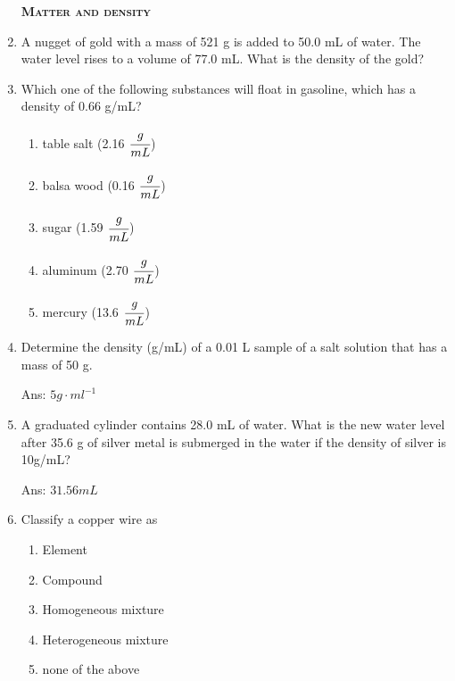 \documentclass[main.tex]{subfiles}
\begin{document}
\begin{multicols*}{2}
\begin{enumerate}
\vspace{0.5cm}
{\raggedright\textsc{\textbf{Matter and density }}\par}


\item A nugget of gold with a mass of 521 g is added to 50.0 mL of water.  The water level rises to a volume of 77.0 mL.  What is the density of the gold?   
\begin{enumerate}[label=(\alph*)]
\end{enumerate}
\item Which one of the following substances will float in gasoline, which has a density of 0.66 g/mL?     
\begin{enumerate}[label=(\alph*)]
\item table salt	(2.16 $\cfrac{g}{mL}$)
\item balsa wood	(0.16 $\cfrac{g}{mL}$)
\item sugar	(1.59 $\cfrac{g}{mL}$)
\item aluminum	(2.70 $\cfrac{g}{mL}$)
\item mercury	(13.6 $\cfrac{g}{mL}$)
\end{enumerate}

\item Determine the density (g/mL) of a 0.01 L sample of a salt solution that has a mass of 50 g.

\begin{flushright}\small Ans:  $5g\cdot ml^{-1}$\end{flushright}

\item A graduated cylinder contains 28.0 mL of water. What is the new water level after
35.6 g of silver metal is submerged in the water if the density of silver is 10g/mL?
\begin{flushright}\small Ans:  $31.56mL$\end{flushright}





\item Classify a copper wire as
\begin{enumerate}[label=(\alph*)]
\item Element
\item Compound
\item Homogeneous mixture
\item Heterogeneous mixture
\item none of the above
\end{enumerate}


\end{enumerate}
\end{multicols*}
\end{document}
